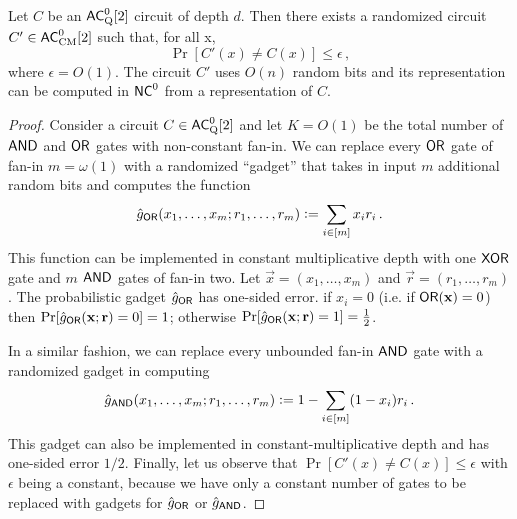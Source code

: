 \begin{lemma}
\label{lemma:razborov}
Let $C$ be an ${\mathsf{AC}}^0_{\text{Q}}[2]$ circuit of depth $d$. Then there exists a randomized circuit $C' \in {\ensuremath{\mathsf{AC}}}^0_{\text{CM}}[2]$ such that, for all x,
\[
\Pr[C'(x) \not = C(x)] \leq \epsilon \, ,
\]
where $\epsilon = O(1)$. The circuit $C'$ uses $O(n)$ random bits and its representation can be computed in ${\mathsf{NC}}^0$ from a representation of $C$.
\end{lemma}
\begin{proof}
Consider a circuit $C \in {\ensuremath{\mathsf{AC}}}^0_{\text{Q}}[2]$ and let $K = O(1)$ be the total number of $\mathsf{AND}$ and $\mathsf{OR}$ gates with non-constant fan-in. We can replace every $\mathsf{OR}$ gate of fan-in $m = \omega(1)$ with a randomized ``gadget'' that takes in input $m$ additional random bits and computes the function
$$\hat{g}_{\mathsf{OR}}(x_1,\dots,x_m; r_1, \dots, r_m) \vcentcolon= \sum_{i \in [m]} x_i r_i \, .$$
This function can  be implemented in constant multiplicative depth with one $\mathsf{XOR}$ gate and $m$ $\mathsf{AND}$ gates of fan-in two.
Let $\vec{x} = (x_1,\dots,x_m)$ and $\vec{r} = (r_1,\dots, r_m)$. The probabilistic gadget $\hat{g}_{\mathsf{OR}}$ has one-sided error. if  $x_i = 0$ (i.e. if $\mathsf{OR}(\mathbf{x}) = 0$) then $\Pr[\hat{g}_{\mathsf{OR}}(\mathbf{x}; \mathbf{r}) = 0] = 1$; otherwise $\Pr[\hat{g}_{\mathsf{OR}}(\mathbf{x}; \mathbf{r}) = 1] = \frac{1}{2}$.

In a similar fashion, we can replace every unbounded fan-in $\mathsf{AND}$ gate with a randomized gadget in computing
$$\hat{g}_{\mathsf{AND}}(x_1,\dots,x_m; r_1, \dots, r_m) \vcentcolon= 1 - \sum_{i \in [m]} (1 - x_i) r_i \, .$$
This gadget can also be implemented in constant-multiplicative depth and has one-sided error $1/2$.
Finally, let us observe that $\Pr[C'(x) \not = C(x)] \leq \epsilon$ with $\epsilon$ being a constant, because
we have only a constant number of gates to be replaced with gadgets for $\hat{g}_{\mathsf{OR}}$ or $\hat{g}_{\mathsf{AND}}$.


\end{proof}
